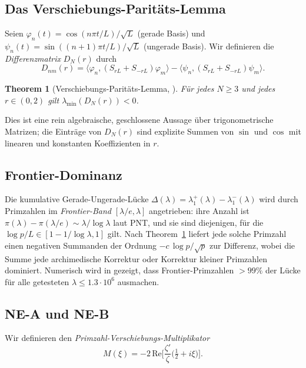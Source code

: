 \documentclass[12pt,a4paper]{article}
\newtheorem{theorem}{Theorem}[section]
\theoremstyle{definition}
\theoremstyle{remark}
\begin{document}
\subsection{Das Verschiebungs-Paritäts-Lemma}

Seien $\varphi_n(t) = \cos(n\pi t/L)/\sqrt{L}$ (gerade Basis) und
$\psi_n(t) = \sin((n+1)\pi t/L)/\sqrt{L}$ (ungerade Basis). Wir definieren die
\emph{Differenzmatrix} $D_N(r)$ durch
\begin{equation}
\label{eq:DN}
D_{nm}(r) = \langle\varphi_n, (S_{rL}+S_{-rL})\varphi_m\rangle - \langle\psi_n, (S_{rL}+S_{-rL})\psi_m\rangle.
\end{equation}

\begin{theorem}[Verschiebungs-Paritäts-Lemma, \cite{Geiger2026partII}]
\label{thm:SPL}
Für jedes $N \ge 3$ und jedes $r \in (0, 2)$ gilt $\lambda_{\min}(D_N(r)) < 0$.
\end{theorem}

Dies ist eine rein algebraische, geschlossene Aussage über trigonometrische
Matrizen; die Einträge von $D_N(r)$ sind explizite Summen von $\sin$ und $\cos$
mit linearen und konstanten Koeffizienten in $r$.

\subsection{Frontier-Dominanz}

Die kumulative Gerade-Ungerade-Lücke $\Delta(\lambda) = \lambda_1^+(\lambda) - \lambda_1^-(\lambda)$
wird durch Primzahlen im \emph{Frontier-Band} $[\lambda/e, \lambda]$ angetrieben: ihre
Anzahl ist $\pi(\lambda) - \pi(\lambda/e) \sim \lambda/\log\lambda$ laut PNT,
und sie sind diejenigen, für die $\log p / L \in [1-1/\log\lambda, 1]$ gilt. Nach
Theorem~\ref{thm:SPL} liefert jede solche Primzahl einen negativen Summanden der
Ordnung $-c\,\log p / \sqrt{p}$ zur Differenz, wobei die Summe jede
archimedische Korrektur oder Korrektur kleiner Primzahlen dominiert. Numerisch wird in \cite{Geiger2026partII}
gezeigt, dass Frontier-Primzahlen $> 99\%$ der Lücke für alle getesteten
$\lambda \le 1.3\cdot 10^6$ ausmachen.

\subsection{NE-A und NE-B}

Wir definieren den \emph{Primzahl-Verschiebungs-Multiplikator}
\begin{equation}
\label{eq:Mxi}
M(\xi) = -2\,\mathrm{Re}\Big[\frac{\zeta'}{\zeta}\Big(\tfrac{1}{2}+i\xi\Big)\Big].
\end{equation}
\end{document}
